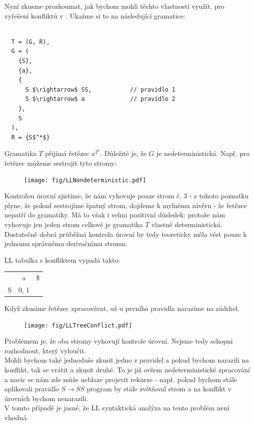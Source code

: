 Nyní zkusme prozkoumat, jak bychom mohli těchto vlastností využít, pro
vyřešení konfliktů v . Ukažme si to na následující gramatice:
\begin{exmp}
  \label{exmp:aa}
  \begin{lstlisting}

  T = (G, R),
  G = (
    {S},
    {a},
    {
      S $\rightarrow$ SS,           // pravidlo 1
      S $\rightarrow$ a             // pravidlo 2
    },
    S
  ),
  R = {S$^*$}
  \end{lstlisting}
  Gramatika $T$ přijímá řetězec $a^{2^n}$. Důležité je, že
   $G$ je
  nedeterministická. Např. pro řetězec  můžeme sestrojit
  tyto stromy:

  \begin{figure}[H]
    \centering
    \texttt{[image: fig/LLNondeterministic.pdf]}
  \end{figure}
  Kontrolou úrovní zjistíme, že nám vyhovuje pouze strom č. 3 - z tohoto
  poznatku plyne, že pokud sestrojíme špatný strom, dojdeme k mylnému závěru
  - že řetězec nepatří do gramatiky. Má to však i velmi pozitivní důsledek:
  protože nám vyhovuje jen jeden strom celkově je gramatika $T$ vlastně
  deterministická. Dostatečně dobrá průběžná kontrola úrovní by tedy teoreticky
  měla vést pouze k jednomu správnému derivačnímu stromu.

  LL tabulka s konfliktem vypadá takto:
  \begin{table}[H]
    \centering
    \begin{tabular}{| c || c | c |}
      \hline
        & a & \$  \\
      \hhline{|=||=|=|}
      S & 0, 1 &  \\
      \hline
    \end{tabular}
  \end{table}

  Když zkusíme řetězec zpracovávat, už u prvního pravidla narazíme na zádrhel.

  \begin{figure}[H]
    \centering
    \texttt{[image: fig/LLTreeConflict.pdf]}
  \end{figure}

  Problémem je, že oba stromy vyhovují kontrole úrovní.
  Nejsme tedy schopni rozhodnout, který vyloučit.\\

  Mohli bychom také jednoduše zkusit jedno z pravidel a pokud bychom narazili na
  konflikt, tak se vrátit a zkusit druhé. To je již ovšem nedeterministické
  zpracování a navíc se nám zde může neblaze projevit rekurze - např. pokud bychom
  stále aplikovali pravidlo $S \rightarrow SS$ program by stále zvětšoval strom
  a na konflikt v úrovních bychom nenarazili.\\
  V tomto případě je jasné, že LL syntaktická analýza na tento problém
  není vhodná.

\end{exmp}

